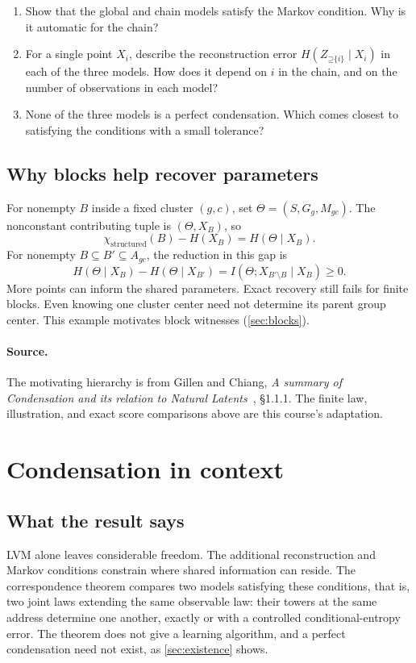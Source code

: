 \documentclass[11pt]{article}
\newcommand{\Up}{\mathord{\supseteq}}
\begin{document}
\begin{exercise}
\label{ex:organizations}
\begin{enumerate}
\item Show that the global and chain models satisfy the Markov condition. Why
is it automatic for the chain?
\item For a single point $X_i$, describe the reconstruction error
$H(Z_{\Up\{i\}}\mid X_i)$ in each of the three models. How does it depend on
$i$ in the chain, and on the number of observations in each model?
\item None of the three models is a perfect condensation. Which comes closest
to satisfying the conditions with a small tolerance?
\end{enumerate}
\end{exercise}

\subsection{Why blocks help recover parameters}
For nonempty $B$ inside a fixed cluster $(g,c)$, set $\Theta=(S,G_g,M_{gc})$. The
nonconstant contributing tuple is $(\Theta,X_B)$, so
\[
 \chi_{\mathrm{structured}}(B)-H(X_B)=H(\Theta\mid X_B).
\]
For nonempty $B\subseteq B'\subseteq A_{gc}$, the reduction in this gap is
\[
 H(\Theta\mid X_B)-H(\Theta\mid X_{B'})
 =I(\Theta;X_{B'\setminus B}\mid X_B)\ge0.
\]
More points can inform the shared parameters. Exact recovery still fails for
finite blocks. Even knowing one cluster center need not determine its parent
group center. This example motivates block witnesses (\cref{sec:blocks}).

\paragraph{Source.}
The motivating hierarchy is from Gillen and Chiang,
\emph{A summary of
Condensation and its relation to Natural Latents}~\citep{gillen2026summary}, \S1.1.1. The finite law,
illustration, and exact score comparisons above are this course's adaptation.

\section{Condensation in context}
\label{sec:context}
\subsection{What the result says}
LVM alone leaves considerable freedom. The additional reconstruction
and Markov conditions constrain where shared information can reside. The
correspondence theorem compares two models satisfying these conditions, that
is, two joint laws extending the same observable law: their towers at
the same address determine one another, exactly or with a controlled
conditional-entropy error. The theorem does not give a learning algorithm, and
a perfect condensation need not exist, as \cref{sec:existence} shows.
\end{document}
